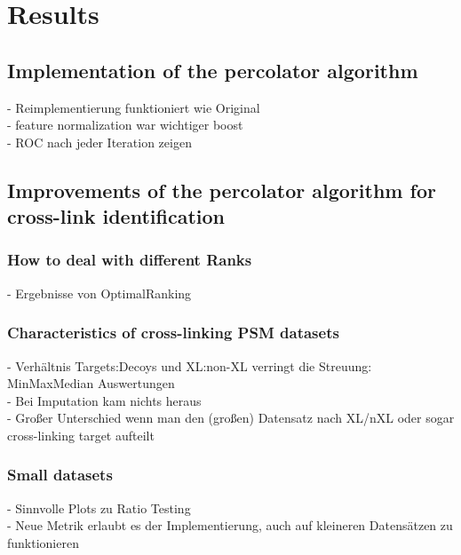 \documentclass[10pt,a4paper]{article}
\begin{document}
	\section{Results}
	
		\subsection{Implementation of the percolator algorithm}
			- Reimplementierung funktioniert wie Original\\
			- feature normalization war wichtiger boost\\
			- ROC nach jeder Iteration zeigen
			
		\subsection{Improvements of the percolator algorithm for cross-link identification}
		\subsubsection{How to deal with different Ranks}
			- Ergebnisse von OptimalRanking
			
		\subsubsection{Characteristics of cross-linking PSM datasets}
			- Verhältnis Targets:Decoys und XL:non-XL verringt die Streuung: MinMaxMedian Auswertungen\\
			- Bei Imputation kam nichts heraus\\
			- Großer Unterschied wenn man den (großen) Datensatz nach XL/nXL oder sogar cross-linking target aufteilt\\
			
		\subsubsection{Small datasets}
			- Sinnvolle Plots zu Ratio Testing\\
			- Neue Metrik erlaubt es der Implementierung, auch auf kleineren Datensätzen zu funktionieren
					
\end{document}
